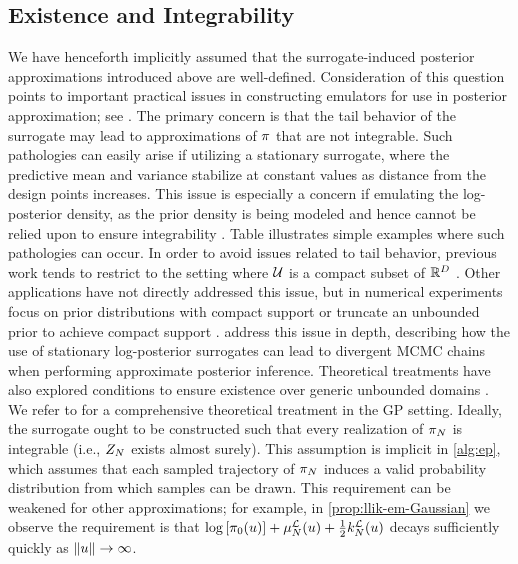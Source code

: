 \documentclass[12pt]{article}
\begin{document}
\subsection{Existence and Integrability} \label{sec:existence}
We have henceforth implicitly assumed that the surrogate-induced posterior approximations 
introduced above are well-defined. Consideration of this question points to important 
practical issues in constructing emulators for use in posterior approximation; see
. The primary concern
is that the tail behavior of the surrogate may lead to approximations of $\postDens$ that 
are not integrable. Such pathologies can easily arise if utilizing a stationary surrogate, where 
the predictive mean and variance stabilize at constant values as distance from the design points 
increases. This issue is especially a concern if emulating the log-posterior density, as the prior 
density is being modeled and hence cannot be relied upon to ensure integrability \citep{emPostDens}.
Table \todo illustrates simple examples where such pathologies can occur.
In order to avoid issues related to
tail behavior, previous work tends to restrict to the setting where $\parSpace$
is a compact subset of $\R^{\dimPar}$ \citep{StuartTeck1, VehtariParallelGP}.
Other applications have not directly addressed this issue, but in numerical experiments focus on 
prior distributions with compact support \citet{trainDynamics,FATES_CES} or truncate an unbounded
prior to achieve compact support \citep{gp_surrogates_random_exploration,FerEmulation}. 
\citet{emPostDens} address this issue in depth, describing how the use of stationary log-posterior
surrogates can lead to divergent MCMC chains when performing approximate posterior inference.
Theoretical treatments have also explored conditions to ensure existence over generic unbounded
domains \citep{random_fwd_models,garegnani2021NoisyMCMC}. We refer to 
\citep{StuartTeck1,StuartTeck2} for a comprehensive theoretical treatment in the GP setting.
Ideally, the surrogate ought to be constructed such that every realization of $\postEm[\Ndesign]$
is integrable (i.e., $\normCstEm$ exists almost surely). This assumption is implicit in \cref{alg:ep}, 
which assumes that each sampled trajectory of $\postEm[\Ndesign]$ induces a valid probability 
distribution from which samples can be drawn. This requirement can be weakened for other 
approximations; for example, in \cref{prop:llik-em-Gaussian} we observe the requirement is that
$\log\left[\priorDens(\Par)\right] + \emMean[\Ndesign]{\llik}(\Par) + \frac{1}{2}\emKer[\Ndesign]{\llik}(\Par)$
decays sufficiently quickly as $\norm{\Par} \to \infty$. 
\end{document}
